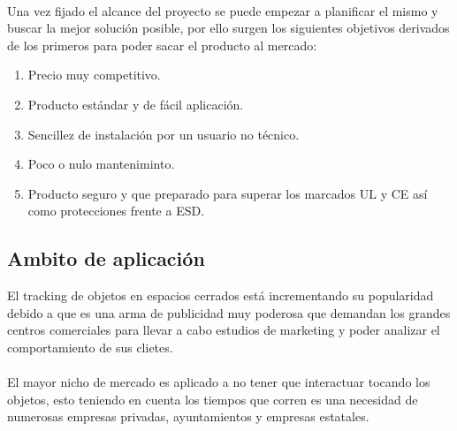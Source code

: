 \documentclass[a4paper ,12pt, onecolumn]{article}
\begin{document}
        \paragraph{}
        Una vez fijado el alcance del proyecto se puede empezar a planificar el mismo y buscar la mejor solución 
        posible, por ello surgen los siguientes objetivos derivados de los primeros para poder sacar el producto 
        al mercado:
        \begin{enumerate}
            \item Precio muy competitivo.
            \item Producto estándar y de fácil aplicación.
            \item Sencillez de instalación por un usuario no técnico.
            \item Poco o nulo manteniminto.
            \item Producto seguro y que preparado para superar los marcados UL y CE así como protecciones frente a ESD.
        \end{enumerate}
    \subsection{Ambito de aplicación}
        El tracking de objetos en espacios cerrados está incrementando su popularidad debido a que es una 
        arma de publicidad muy poderosa que demandan los grandes centros comerciales para llevar a cabo estudios de marketing
        y poder analizar el comportamiento de sus clietes.
        \paragraph{}
        El mayor nicho de mercado es aplicado a no tener que interactuar tocando los objetos, 
        esto teniendo en cuenta los tiempos que corren es una necesidad de numerosas empresas privadas, ayuntamientos 
        y empresas estatales.
\end{document}
